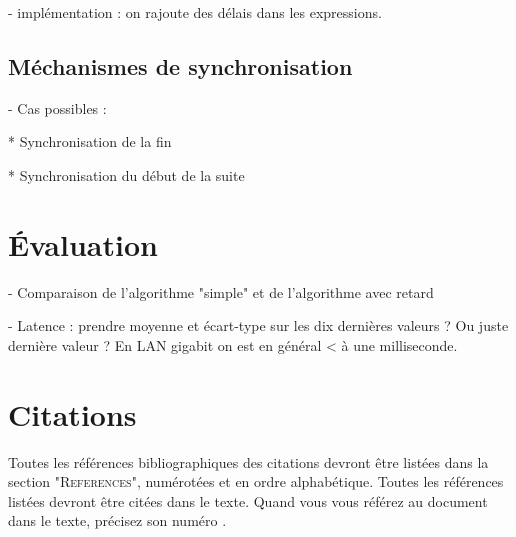 \documentclass{article}
\begin{document}
- implémentation : on rajoute des délais dans les expressions.

\subsection{Méchanismes de synchronisation}
- Cas possibles : 


* Synchronisation de la fin

* Synchronisation du début de la suite

\section{Évaluation}\label{sec.evaluation}

- Comparaison de l'algorithme "simple" et de l'algorithme avec retard


- Latence : prendre moyenne et écart-type sur les dix dernières valeurs ? Ou juste dernière valeur ?
En LAN gigabit on est en général < à une milliseconde.

\section{Citations}

Toutes les références bibliographiques des citations devront être listées dans la section "\textsc{References}", numérotées et en ordre alphabétique. Toutes les références  listées devront être citées dans le texte. Quand  vous vous référez au document dans le texte, précisez son numéro \cite{Author:00}.


\end{document}

